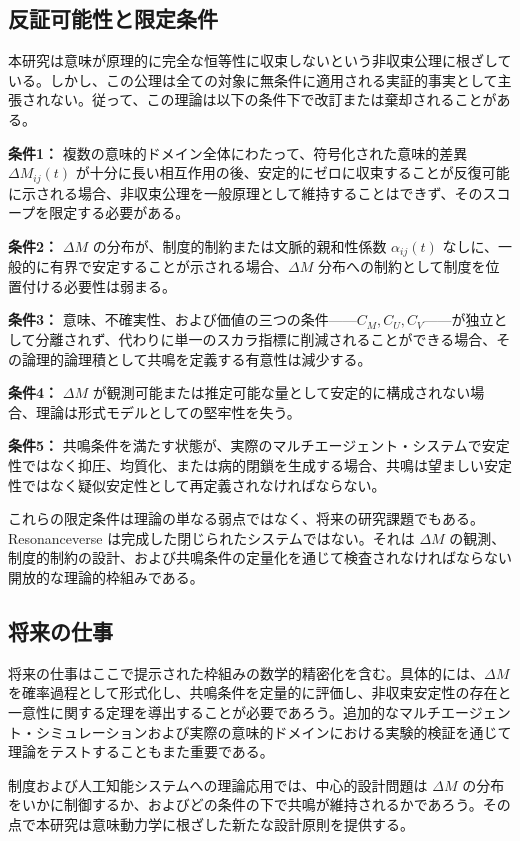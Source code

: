 \documentclass[11pt,a4paper]{article}
\theoremstyle{definition}
\begin{document}
\subsection{反証可能性と限定条件}

本研究は意味が原理的に完全な恒等性に収束しないという非収束公理に根ざしている。しかし、この公理は全ての対象に無条件に適用される実証的事実として主張されない。従って、この理論は以下の条件下で改訂または棄却されることがある。

\textbf{条件1：} 複数の意味的ドメイン全体にわたって、符号化された意味的差異 $\Delta M_{ij}(t)$ が十分に長い相互作用の後、安定的にゼロに収束することが反復可能に示される場合、非収束公理を一般原理として維持することはできず、そのスコープを限定する必要がある。

\textbf{条件2：} $\Delta M$ の分布が、制度的制約または文脈的親和性係数 $\alpha_{ij}(t)$ なしに、一般的に有界で安定することが示される場合、$\Delta M$ 分布への制約として制度を位置付ける必要性は弱まる。

\textbf{条件3：} 意味、不確実性、および価値の三つの条件——$C_M, C_U, C_V$——が独立として分離されず、代わりに単一のスカラ指標に削減されることができる場合、その論理的論理積として共鳴を定義する有意性は減少する。

\textbf{条件4：} $\Delta M$ が観測可能または推定可能な量として安定的に構成されない場合、理論は形式モデルとしての堅牢性を失う。

\textbf{条件5：} 共鳴条件を満たす状態が、実際のマルチエージェント・システムで安定性ではなく抑圧、均質化、または病的閉鎖を生成する場合、共鳴は望ましい安定性ではなく疑似安定性として再定義されなければならない。

これらの限定条件は理論の単なる弱点ではなく、将来の研究課題でもある。Resonanceverse は完成した閉じられたシステムではない。それは $\Delta M$ の観測、制度的制約の設計、および共鳴条件の定量化を通じて検査されなければならない開放的な理論的枠組みである。

\subsection{将来の仕事}

将来の仕事はここで提示された枠組みの数学的精密化を含む。具体的には、$\Delta M$ を確率過程として形式化し、共鳴条件を定量的に評価し、非収束安定性の存在と一意性に関する定理を導出することが必要であろう。追加的なマルチエージェント・シミュレーションおよび実際の意味的ドメインにおける実験的検証を通じて理論をテストすることもまた重要である。

制度および人工知能システムへの理論応用では、中心的設計問題は $\Delta M$ の分布をいかに制御するか、およびどの条件の下で共鳴が維持されるかであろう。その点で本研究は意味動力学に根ざした新たな設計原則を提供する。
\end{document}

